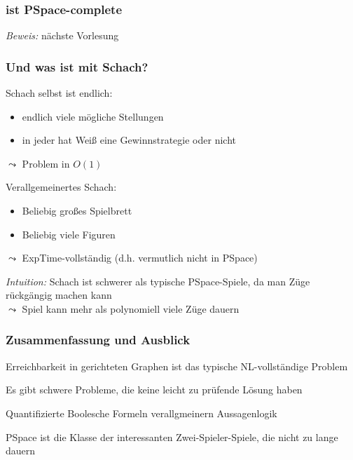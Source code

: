 \documentclass[onlymath]{beamer}
\begin{document}
\begin{frame}\frametitle{ ist PSpace-complete}

\pause

\emph{Beweis:} nächste Vorlesung

\end{frame}

\begin{frame}\frametitle{Und was ist mit Schach?}
\pause

Schach selbst ist endlich:
\begin{itemize}
\item endlich viele mögliche Stellungen
\item in jeder hat Weiß eine Gewinnstrategie oder nicht
\end{itemize}
$\leadsto$ Problem in $O(1)$
\bigskip\pause

\alert{Verallgemeinertes Schach:}
\begin{itemize}
\item Beliebig großes Spielbrett
\item Beliebig viele Figuren
\end{itemize}
$\leadsto$ ExpTime-vollständig (d.h. vermutlich nicht in PSpace)
\bigskip\pause

\emph{Intuition:} Schach ist schwerer als typische PSpace-Spiele, da man 
Züge rückgängig machen kann\\
$\leadsto$ Spiel kann mehr als polynomiell viele Züge dauern
\end{frame}



\begin{frame}\frametitle{Zusammenfassung und Ausblick}

Erreichbarkeit in gerichteten Graphen ist das typische NL-vollständige Problem
\bigskip

Es gibt schwere Probleme, die keine leicht zu prüfende Lösung haben\bigskip

Quantifizierte Boolesche Formeln verallgmeinern Aussagenlogik\bigskip

PSpace ist die Klasse der interessanten Zwei-Spieler-Spiele, die nicht zu lange dauern
\bigskip


\end{frame}
\end{document}
